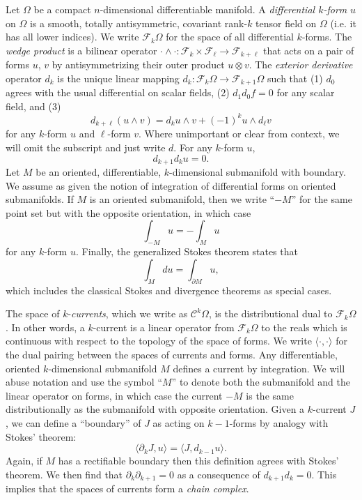 \documentclass[twocolumn]{article}
\begin{document}
Let $\Omega$ be a compact $n$-dimensional differentiable manifold.
A \emph{differential $k$-form} $u$ on $\Omega$ is a smooth, totally antisymmetric, covariant rank-$k$ tensor field on $\Omega$ (i.e. it has all lower indices).
We write $\mathscr F_k\Omega$ for the space of all differential $k$-forms.
The \emph{wedge product} is a bilinear operator $\cdot\wedge\cdot : \mathscr F_k\times\mathscr F_\ell \to \mathscr F_{k + \ell}$ that acts on a pair of forms $u$, $v$ by antisymmetrizing their outer product $u \otimes v$.
The \emph{exterior derivative} operator $d_k$ is the unique linear mapping $d_k : \mathscr F_k\Omega \to \mathscr F_{k + 1}\Omega$ such that (1) $d_0$ agrees with the usual differential on scalar fields, (2) $d_1d_0f = 0$ for any scalar field, and (3)
\begin{equation}
    d_{k + \ell}(u\wedge v) = d_ku\wedge v + (-1)^k u\wedge d_\ell v
\end{equation}
for any $k$-form $u$ and $\ell$-form $v$.
Where unimportant or clear from context, we will omit the subscript and just write $d$.
For any $k$-form $u$,
\begin{equation}
    d_{k + 1}d_k u = 0.
\end{equation}
Let $M$ be an oriented, differentiable, $k$-dimensional submanifold with boundary.
We assume as given the notion of integration of differential forms on oriented submanifolds.
If $M$ is an oriented submanifold, then we write ``$-M$'' for the same point set but with the opposite orientation, in which case
\begin{equation}
    \int_{-M}u = -\int_M u
\end{equation}
for any $k$-form $u$.
Finally, the generalized Stokes theorem states that
\begin{equation}
    \int_Mdu = \int_{\partial M}u,
\end{equation}
which includes the classical Stokes and divergence theorems as special cases.

The space of $k$-\emph{currents}, which we write as $\mathscr C^k\Omega$, is the distributional dual to $\mathscr F_k\Omega$.
In other words, a $k$-current is a linear operator from $\mathscr F_k\Omega$ to the reals which is continuous with respect to the topology of the space of forms.
We write $\langle\cdot,\cdot\rangle$ for the dual pairing between the spaces of currents and forms.
Any differentiable, oriented $k$-dimensional submanifold $M$ defines a current by integration.
We will abuse notation and use the symbol ``$M$'' to denote both the submanifold and the linear operator on forms, in which case the current $-M$ is the same distributionally as the submanifold with opposite orientation.
Given a $k$-current $J$, we can define a ``boundary'' of $J$ as acting on $k - 1$-forms by analogy with Stokes' theorem:
\begin{equation}
    \langle \partial_kJ, u\rangle = \langle J, d_{k - 1}u\rangle.
\end{equation}
Again, if $M$ has a rectifiable boundary then this definition agrees with Stokes' theorem.
We then find that $\partial_k\partial_{k + 1} = 0$ as a consequence of $d_{k + 1}d_k = 0$.
This implies that the spaces of currents form a \emph{chain complex}.
\end{document}
